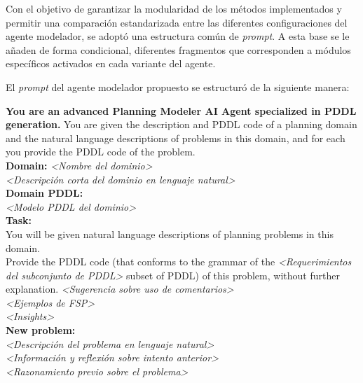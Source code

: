 \begin{anexes}
Con el objetivo de garantizar la modularidad de los métodos implementados y permitir una comparación estandarizada entre las diferentes configuraciones del agente modelador, se adoptó una estructura común de \textit{prompt}. A esta base se le añaden de forma condicional, diferentes fragmentos que corresponden a módulos específicos activados en cada variante del agente.

El \textit{prompt} del agente modelador propuesto se estructuró de la siguiente manera:

\begin{tcolorbox}[colback=gray!10!white, colframe=black, title=\textit{Prompt} base del agente modelador propuesto, fonttitle=\bfseries, breakable]
\textbf{You are an advanced Planning Modeler AI Agent specialized in PDDL generation.} You are given the description and PDDL code of a planning domain and the natural language descriptions of problems in this domain, and for each you provide the PDDL code of the problem. \\

\textbf{Domain:} \textit{<Nombre del dominio>} \\
\textit{<Descripción corta del dominio en lenguaje natural>} \\

\textbf{Domain PDDL:} \\
\textit{<Modelo PDDL del dominio>} \\

\textbf{Task:} \\
You will be given natural language descriptions of planning problems in this domain. \\
Provide the PDDL code (that conforms to the grammar of the \textit{<Requerimientos del subconjunto de PDDL>} subset of PDDL) of this problem, without further explanation. \textit{<Sugerencia sobre uso de comentarios>} \\

\textit{<Ejemplos de FSP>} \\

\textit{<Insights>} \\

\textbf{New problem:} \\
\textit{<Descripción del problema en lenguaje natural>} \\

\textit{<Información y reflexión sobre intento anterior>} \\

\textit{<Razonamiento previo sobre el problema>} \\


\end{tcolorbox}
\end{anexes}
